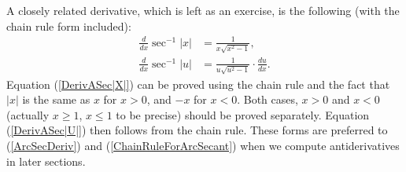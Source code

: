 A closely related derivative, which is left as an exercise, is
the following (with the chain rule form included):
\begin{align}
\frac{d}{dx}\sec^{-1}|x|&=\frac1{x\sqrt{x^2-1}},\label{DerivASec|X|}\\
\frac{d}{dx}\sec^{-1}|u|&=\frac1{u\sqrt{u^2-1}}\cdot\frac{du}{dx}.
\label{DerivASec|U|}
\end{align}
Equation (\ref{DerivASec|X|})
can be proved using the chain rule and the fact that
$|x|$ is the same as $x$ for $x>0$, and $-x$ for $x<0$.
Both cases, $x>0$ and $x<0$ (actually $x\ge1$, $x\le 1$ to be precise) 
should be proved separately.  Equation (\ref{DerivASec|U|}) then
follows from the chain rule.  These
forms are preferred to (\ref{ArcSecDeriv}) and
(\ref{ChainRuleForArcSecant}) when we 
compute antiderivatives in later sections.


